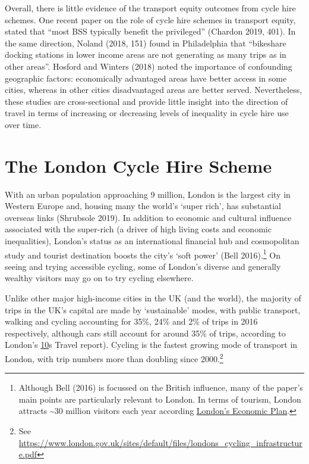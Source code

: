 \documentclass[]{article}
\begin{document}
Overall, there is little evidence of the transport equity outcomes from cycle hire schemes.
One recent paper on the role of cycle hire schemes in transport equity, stated that ``most BSS typically benefit the privileged'' (Chardon 2019, 401).
In the same direction, Noland (2018, 151) found in Philadelphia that ``bikeshare docking stations in lower income areas are not generating as many trips as in other areas''.
Hosford and Winters (2018) noted the importance of confounding geographic factors: economically advantaged areas have better access in some cities, whereas in other cities disadvantaged areas are better served.
Nevertheless, these studies are cross-sectional and provide little insight into the direction of travel in terms of increasing or decreasing levels of inequality in cycle hire use over time.

\hypertarget{the-london-cycle-hire-scheme}{%
\section{The London Cycle Hire Scheme}\label{the-london-cycle-hire-scheme}}

With an urban population approaching 9 million, London is the largest city in Western Europe and, housing many the world's `super rich', has substantial overseas links (Shrubsole 2019).
In addition to economic and cultural influence associated with the super-rich (a driver of high living costs and economic inequalities), London's status as an international financial hub and cosmopolitan study and tourist destination boosts the city's `soft power' (Bell 2016).\footnote{Although Bell (2016) is focussed on the British influence, many of the paper's main points are particularly relevant to London.
  In terms of tourism, London attracts \textasciitilde{}30 million visitors each year according \href{http://www.uncsbrp.org/tourism.htm}{London's Economic Plan}.}
On seeing and trying accessible cycling, some of London's diverse and generally wealthy visitors may go on to try cycling elsewhere.

Unlike other major high-income cities in the UK (and the world), the majority of trips in the UK's capital are made by `sustainable' modes, with public transport, walking and cycling accounting for 35\%, 24\% and 2\% of trips in 2016 respectively, although cars still account for around 35\% of trips, according to London's \href{https://www.google.com/url?sa=t\&rct=j\&q=\&esrc=s\&source=web\&cd=5\&ved=2ahUKEwjj6b6pldXlAhV5ShUIHRQZBYQQFjAEegQIAhAC\&url=https\%3A\%2F\%2Ftfl.gov.uk\%2Fcdn\%2Fstatic\%2Fcms\%2Fdocuments\%2Ftravel-in-london-report-10-data.xlsx\&usg=AOvVaw3wFwZPyKmV86i71fCoa0Bo}{10}s Travel report).
Cycling is the fastest growing mode of transport in London, with trip numbers more than doubling since 2000.\footnote{See \url{https://www.london.gov.uk/sites/default/files/londons_cycling_infrastructure.pdf}}
\end{document}
